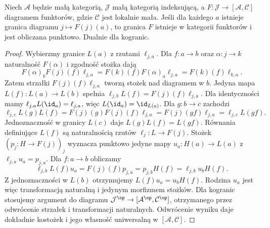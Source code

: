 \begin{twierdzenie}\label{cat:thm:pointwise-limits}
Niech $\mathcal A$ będzie małą kategorią, $\mathcal J$ małą kategorią indeksującą, a $F:\mathcal J\to[\mathcal A,\mathcal C]$ diagramem funktorów, gdzie $\mathcal C$ jest lokalnie mała. Jeśli dla każdego $a$ istnieje granica diagramu $j\mapsto F(j)(a)$, to granica $F$ istnieje w kategorii funktorów i jest obliczana punktowo. Dualnie dla kogranic.
\end{twierdzenie}
\begin{proof}
Wybierzmy granice $L(a)$ z rzutami $\ell_{j,a}$. Dla $f:a\to b$ oraz $\alpha:j\to k$ naturalność $F(\alpha)$ i zgodność stożka dają
\[
F(\alpha)_bF(j)(f)\ell_{j,a}
=F(k)(f)F(\alpha)_a\ell_{j,a}
=F(k)(f)\ell_{k,a}.
\]
Zatem strzałki $F(j)(f)\ell_{j,a}$ tworzą stożek nad diagramem w $b$. Jedyna mapa $L(f):L(a)\to L(b)$ spełnia
$\ell_{j,b}L(f)=F(j)(f)\ell_{j,a}$.
Dla identyczności mamy $\ell_{j,a}L(\id_a)=\ell_{j,a}$, więc $L(\id_a)=\id_{L(a)}$. Dla $g:b\to c$ zachodzi
\[
\ell_{j,c}L(g)L(f)=F(j)(g)F(j)(f)\ell_{j,a}
=F(j)(gf)\ell_{j,a}=\ell_{j,c}L(gf).
\]
Jednoznaczność w granicy $L(c)$ daje $L(g)L(f)=L(gf)$. Równania definiujące $L(f)$ są naturalnością rzutów $\ell_j:L\to F(j)$. Stożek $(p_j:H\to F(j))_j$ wyznacza punktowo jedyne mapy $u_a:H(a)\to L(a)$ z $\ell_{j,a}u_a=p_{j,a}$. Dla $f:a\to b$ obliczamy
\[
\ell_{j,b}L(f)u_a=F(j)(f)p_{j,a}
=p_{j,b}H(f)=\ell_{j,b}u_bH(f).
\]
Z jednoznaczności w $L(b)$ otrzymujemy $L(f)u_a=u_bH(f)$. Rodzina $u_a$ jest więc transformacją naturalną i jedynym morfizmem stożków. Dla kogranic stosujemy argument do diagramu $\mathcal J^{\op}\to[\mathcal A^{\op},\mathcal C^{\op}]$, otrzymanego przez odwrócenie strzałek i transformacji naturalnych. Odwrócenie wyniku daje dokładnie kostożek i jego własność uniwersalną w $[\mathcal A,\mathcal C]$.
\end{proof}

